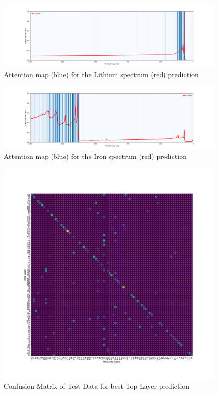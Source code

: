 \begin{figure}[H]
    \centering
    \includegraphics[width=\textwidth]{Figures/attention_map_Li.png}
    \caption{Attention map (blue) for the Lithium spectrum (red) prediction}
    \label{att:dy}
\end{figure}
\begin{figure}[H]
    \centering
    \includegraphics[width=\textwidth]{Figures/attention_map_Fe.png}
    \caption{Attention map (blue) for the Iron spectrum (red) prediction}
    \label{att:c}
\end{figure}




\begin{center}
\begin{figure}[H]
        \centerline{\includegraphics[width=1.4\textwidth]{Figures/best_task_1_model_CM.png}}
    \centering
    \caption{Confusion Matrix of Test-Data for best Top-Layer prediction}
    \label{cm_cnn_1l}
\end{figure}
\end{center}



